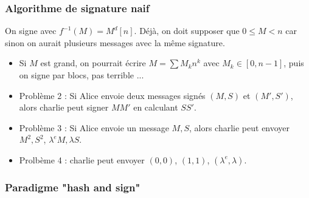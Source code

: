             \subsubsection{Algorithme de signature naif}
                On signe avec $f^{-1}(M) = M^d[n]$. Déjà, on doit supposer que $0 \leq M < n$ car sinon on aurait plusieurs messages avec la même signature.
                \begin{itemize}
                    \item Si $M$ est grand, on pourrait écrire $M = \sum M_kn^k$ avec $M_k \in [0, n-1]$, puis on signe par blocs, pas terrible ... 
                    \item Problème 2 : Si Alice envoie deux messages signés $(M,S)$ et $(M',S')$, alors charlie peut signer $MM'$ en calculant $SS'$.
                    \item Problème 3 : Si Alice envoie un message $M,S$, alors charlie peut envoyer $M^2, S^2$, $\lambda^eM, \lambda S$.
                    \item Prolbème 4 : charlie peut envoyer $(0, 0)$, $(1, 1)$, $(\lambda^e, \lambda)$.
                \end{itemize}
                
            \subsubsection{Paradigme "hash and sign"}

